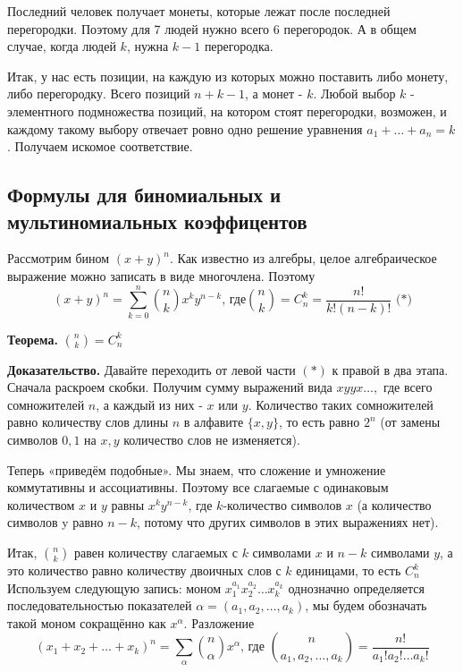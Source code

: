 \documentclass[a4paper, 10pt]{article}
\begin{document}
Последний человек получает монеты, которые лежат после последней перегородки. Поэтому для 7 людей нужно всего 6 перегородок. А в общем случае, когда людей $k$, нужна $k - 1$ перегородка.

Итак, у нас есть позиции, на каждую из которых можно поставить либо монету, либо перегородку. Всего позиций $n + k - 1$, а монет - $k$. Любой выбор $k$ - элементного подмножества позиций, на котором стоят перегородки, возможен, и каждому такому выбору отвечает ровно одно решение уравнения $a_1 + \dots + a_n = k$. Получаем искомое соответствие.

\subsection{Формулы для биномиальных и мультиномиальных коэффицентов}

Рассмотрим бином $(x + y)^n$. Как известно из алгебры, целое алгебраическое выражение можно записать в виде многочлена. Поэтому $$(x + y)^n = \sum^n_{k = 0} \binom{n}{k}x^{k}y^{n - k}\text{, где} \binom{n}{k} = C^k_n = \frac{n!}{k!(n - k)!} \text{ (*)}$$

\textbf{Теорема.} $\binom{n}{k} = C^k_n$

\textbf{Доказательство.} Давайте переходить от левой части $(*)$ к правой в два этапа. Сначала раскроем скобки. Получим сумму выражений вида $xyyx \dots ,$ где всего сомножителей $n$, а каждый из них - $x$ или $y$. Количество таких сомножителей равно количеству слов длины $n$ в алфавите $\{x,y\}$, то есть равно $2^n$ (от замены символов $0, 1$ на $x, y$ количество слов не изменяется).

Теперь «приведём подобные». Мы знаем, что сложение и умножение коммутативны и ассоциативны. Поэтому все слагаемые с одинаковым количеством $x$ и $y$ равны $x^ky^{n-k}$, где $k$-количество символов $x$ (а количество символов y равно $n-k$, потому что других символов в этих выражениях нет).

Итак, $\binom{n}{k}$ равен количеству слагаемых с $k$ символами $x$ и $n - k$ символами $y$, а это количество равно количеству двоичных слов с $k$ единицами, то есть $C^k_n$ \\

Используем следующую запись: моном $x_1^{a_1}x_2^{a_2} \dots x_k^{a_k}$ однозначно определяется последовательностью показателей $\alpha =
(a_1, a_2, \dots , a_k)$, мы будем обозначать такой моном сокращённо как $x^{\alpha}$. Разложение $$(x_1 + x_2 + \dots + x_k)^n = \sum_{\alpha}\binom{n}{\alpha}x^{\alpha} \text{, где } \binom{n}{a_1, a_2, \dots , a_k} = \frac{n!}{a_1!a_2! \dots a_k!}$$
\end{document}
